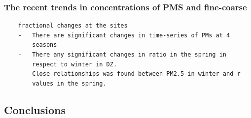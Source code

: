 \documentclass[
  11pt,
]{article}
\begin{document}
\subsubsection{The recent trends in concentrations of PMS and
fine-coarse}\label{the-recent-trends-in-concentrations-of-pms-and-fine-coarse}

\begin{verbatim}
    fractional changes at the sites
    -   There are significant changes in time-series of PMs at 4
        seasons
    -   There any significant changes in ratio in the spring in
        respect to winter in DZ.
    -   Close relationships was found between PM2.5 in winter and r
        values in the spring.
\end{verbatim}

\subsection{Conclusions}\label{conclusions}
\end{document}
